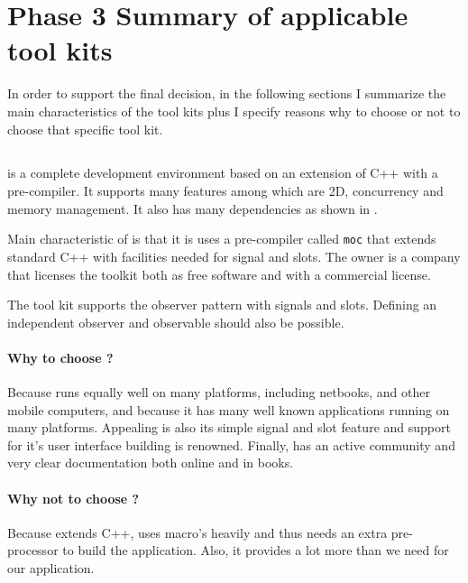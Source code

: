 \section{Phase 3 Summary of applicable tool kits}

In order to support the final decision, in the following sections I summarize
the main characteristics of the tool kits plus I specify reasons why to choose
or not to choose that specific tool kit.

\subsection{} 

 is a complete development environment based on an extension of C++ with
a  pre-compiler. It supports many features among which are 2D,
concurrency and memory management. It also has many dependencies as shown in
\cite{qt:qt-dep}.

Main characteristic of  is that it is uses a pre-compiler called
\texttt{moc} that extends standard C++ with facilities needed for signal and
slots. The owner is a company  that licenses the  toolkit both
as free software and with a commercial license.

The tool kit  supports the observer pattern with signals and slots.
Defining an independent observer and observable should also be possible.

\paragraph{Why to choose ?} Because  runs equally well on many
platforms, including netbooks, and other mobile computers, and because it has
many well known applications running on many platforms. Appealing is also its
simple signal and slot feature and support for it's user interface building is
renowned.  Finally,  has an active community and very clear documentation
both online and in books. 

\paragraph{Why not to choose ?} Because  extends C++, uses macro's
heavily and thus needs an extra pre-processor to build the application. Also,
it provides a lot more than we need for our application.

\subsection{}


